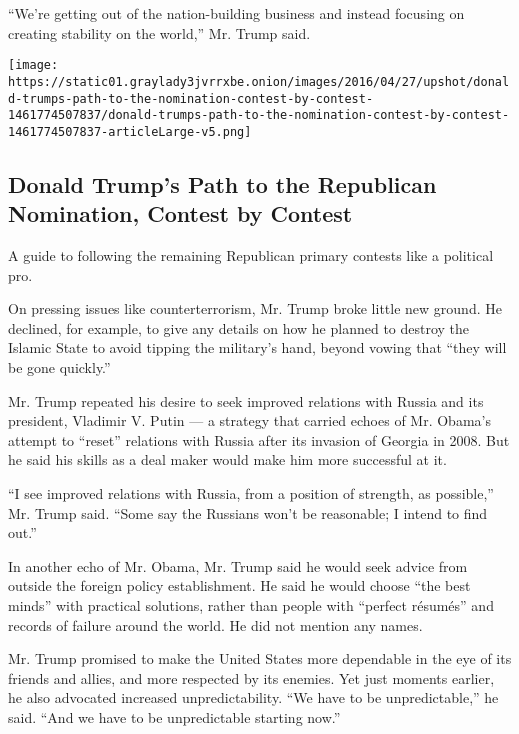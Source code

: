 ``We're getting out of the nation-building business and instead focusing
on creating stability on the world,'' Mr. Trump said.

\href{https://www.nytimes3xbfgragh.onion/interactive/2016/04/27/upshot/donald-trumps-path-to-the-nomination-contest-by-contest.html}{}

\texttt{[image: https://static01.graylady3jvrrxbe.onion/images/2016/04/27/upshot/donald-trumps-path-to-the-nomination-contest-by-contest-1461774507837/donald-trumps-path-to-the-nomination-contest-by-contest-1461774507837-articleLarge-v5.png]}

\hypertarget{donald-trumps-path-to-the-republican-nomination-contest-by-contest}{%
\subsection{Donald Trump's Path to the Republican Nomination, Contest by
Contest}\label{donald-trumps-path-to-the-republican-nomination-contest-by-contest}}

A guide to following the remaining Republican primary contests like a
political pro.

On pressing issues like counterterrorism, Mr. Trump broke little new
ground. He declined, for example, to give any details on how he planned
to destroy the Islamic State to avoid tipping the military's hand,
beyond vowing that ``they will be gone quickly.''

Mr. Trump repeated his desire to seek improved relations with Russia and
its president, Vladimir V. Putin --- a strategy that carried echoes of
Mr. Obama's attempt to ``reset'' relations with Russia after its
invasion of Georgia in 2008. But he said his skills as a deal maker
would make him more successful at it.

``I see improved relations with Russia, from a position of strength, as
possible,'' Mr. Trump said. ``Some say the Russians won't be reasonable;
I intend to find out.''

In another echo of Mr. Obama, Mr. Trump said he would seek advice from
outside the foreign policy establishment. He said he would choose ``the
best minds'' with practical solutions, rather than people with ``perfect
résumés'' and records of failure around the world. He did not mention
any names.

Mr. Trump promised to make the United States more dependable in the eye
of its friends and allies, and more respected by its enemies. Yet just
moments earlier, he also advocated increased unpredictability. ``We have
to be unpredictable,'' he said. ``And we have to be unpredictable
starting now.''

